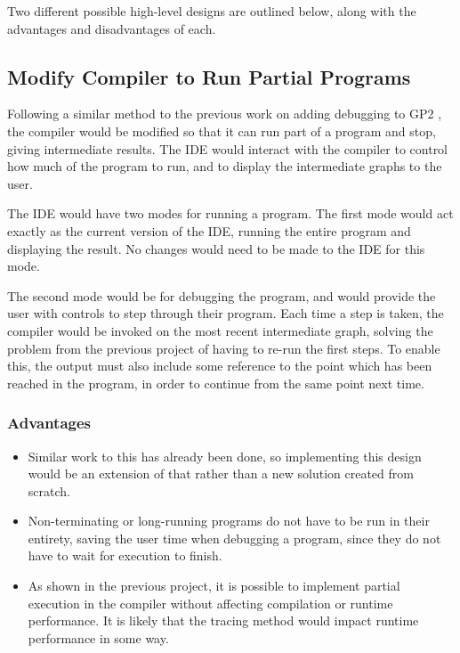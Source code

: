 \documentclass[authoryearcitations]{UoYCSproject}
\begin{document}
Two different possible high-level designs are outlined below, along with the
advantages and disadvantages of each.


\subsection{Modify Compiler to Run Partial Programs}
\label{sec:ProposedDesign1}

Following a similar method to the previous work on adding debugging to GP2
\citep{taylor2016}, the compiler would be modified so that it can run part of a
program and stop, giving intermediate results. The IDE would interact with the
compiler to control how much of the program to run, and to display the
intermediate graphs to the user.

The IDE would have two modes for running a program. The first mode would act
exactly as the current version of the IDE, running the entire program and
displaying the result. No changes would need to be made to the IDE for this mode.

The second mode would be for debugging the program, and would provide the user
with controls to step through their program. Each time a step is taken, the
compiler would be invoked on the most recent intermediate graph, solving the
problem from the previous project of having to re-run the first steps. To
enable this, the output must also include some reference to the point which has
been reached in the program, in order to continue from the same point next time.


\subsubsection{Advantages}
\label{sec:ProposedDesign1Advantages}

\begin{itemize}
    \item Similar work to this has already been done, so implementing this
          design would be an extension of that rather than a new solution
          created from scratch.

    \item Non-terminating or long-running programs do not have to be run in their
          entirety, saving the user time when debugging a program, since they do
          not have to wait for execution to finish.

    \item As shown in the previous project, it is possible to implement partial
          execution in the compiler without affecting compilation or runtime
          performance. It is likely that the tracing method would impact runtime
          performance in some way.
\end{itemize}
\end{document}
